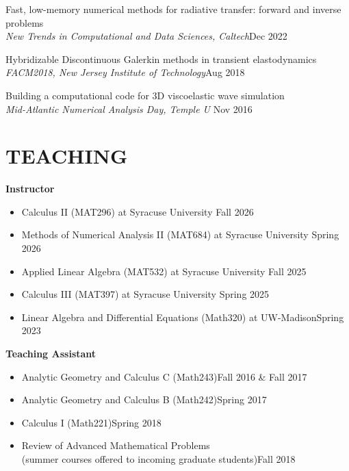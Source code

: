 \documentclass[11pt]{res}
\newenvironment{cvitemize}{\begin{itemize}\itemsep -2pt}{\end{itemize}\vspace{-5pt}}
\newenvironment{cvenumerate}{\begin{etaremune}\itemsep -2pt}{\end{etaremune}\vspace{-5pt}}
\begin{document}
\begin{resume}
\begin{cvenumerate}
\item[]\item[]
\hspace{-1cm}{\bf Poster presentation}

\item Fast, low-memory numerical methods for radiative transfer: forward and inverse problems\\
{\sl New Trends in Computational and Data Sciences, Caltech}\hfill Dec 2022
\item
Hybridizable Discontinuous Galerkin methods
in transient elastodynamics\\
{\sl FACM2018, New Jersey Institute of Technology}\hfill Aug 2018
\item
Building a computational code for 3D viscoelastic wave simulation\\
{\sl Mid-Atlantic Numerical Analysis Day, Temple U} \hfill Nov 2016
\end{cvenumerate}

\section{TEACHING}
{\bf Instructor}
\begin{cvitemize}
\item Calculus II (MAT296) at Syracuse University
\hfill Fall 2026
\item Methods of Numerical Analysis II (MAT684) at Syracuse University
\hfill Spring 2026
\item Applied Linear Algebra (MAT532) at Syracuse University
\hfill Fall 2025
\item Calculus III (MAT397) at Syracuse University \hfill Spring 2025
\item Linear Algebra and Differential Equations (Math320) at UW-Madison\hfill Spring 2023
\end{cvitemize}

{\bf Teaching Assistant}
\begin{cvitemize}
\item Analytic Geometry and Calculus C (Math243)\hfill Fall 2016 \& Fall 2017
\item Analytic Geometry and Calculus B (Math242)\hfill Spring 2017
\item Calculus I (Math221)\hfill Spring 2018
\item Review of Advanced Mathematical Problems\\
(summer courses offered to incoming graduate students)\hfill Fall 2018
\end{cvitemize}


\end{resume}
\end{document}
